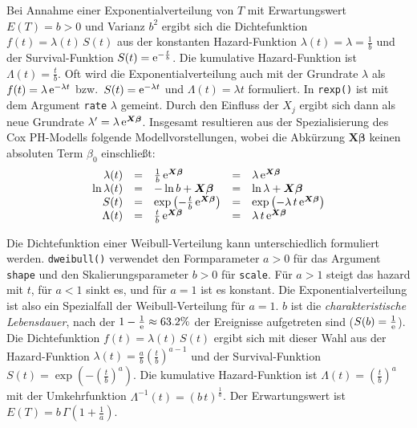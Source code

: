 Bei Annahme einer Exponentialverteilung von $T$ mit Erwartungswert $E(T) = b > 0$ und Varianz $b^{2}$ ergibt sich die Dichtefunktion $f(t) = \lambda(t) \, S(t)$ aus der konstanten Hazard-Funktion $\lambda(t) = \lambda = \frac{1}{b}$ und der Survival-Funktion $S(t) = {\mathrm{e}}^{-\frac{t}{b}}$. Die kumulative Hazard-Funktion ist $\Lambda(t) = \frac{t}{b}$. Oft wird die Exponentialverteilung auch mit der Grundrate $\lambda$ als $f(t) = \lambda \, {\mathrm{e}}^{-\lambda t}$ bzw.\ $S(t) = {\mathrm{e}}^{-\lambda t}$ und $\Lambda(t) = \lambda t$ formuliert. In \lstinline!rexp()! ist mit dem Argument \lstinline!rate! $\lambda$ gemeint. Durch den Einfluss der $X_{j}$ ergibt sich dann als neue Grundrate $\lambda' = \lambda \, {\mathrm{e}}^{\bm{X} \bm{\beta}}$. Insgesamt resultieren aus der Spezialisierung des Cox PH-Modells folgende Modellvorstellungen, wobei die Abkürzung $\bm{X} \bm{\beta}$ keinen absoluten Term $\beta_{0}$ einschließt:
\begin{equation*}
\begin{array}{rclcl}
\lambda(t)     &=& \frac{1}{b} \, {\mathrm{e}}^{\bm{X} \bm{\beta}} &=& \lambda \, {\mathrm{e}}^{\bm{X} \bm{\beta}}\\
\ln \lambda(t) &=& -\ln b + \bm{X} \bm{\beta} &=& \ln \lambda + \bm{X} \bm{\beta}\\
S(t)           &=& \exp\left(-\frac{t}{b} \, {\mathrm{e}}^{\bm{X} \bm{\beta}}\right) &=& \exp\left(-\lambda \, t \, {\mathrm{e}}^{\bm{X} \bm{\beta}}\right)\\
\Lambda(t)     &=& \frac{t}{b} \, {\mathrm{e}}^{\bm{X} \bm{\beta}} &=& \lambda \, t \, {\mathrm{e}}^{\bm{X} \bm{\beta}}
\end{array}
\end{equation*}

Die Dichtefunktion einer Weibull-Verteilung kann unterschiedlich formuliert werden. \lstinline!dweibull()! verwendet den Formparameter $a > 0$ für das Argument \lstinline!shape! und den Skalierungsparameter $b > 0$ für \lstinline!scale!. Für $a > 1$ steigt das hazard mit $t$, für $a < 1$ sinkt es, und für $a = 1$ ist es konstant. Die Exponentialverteilung ist also ein Spezialfall der Weibull-Verteilung für $a = 1$. $b$ ist die \emph{charakteristische Lebensdauer}, nach der $1-\frac{1}{{\mathrm{e}}} \approx 63.2\%$ der Ereignisse aufgetreten sind ($S(b) = \frac{1}{{\mathrm{e}}}$). Die Dichtefunktion $f(t) = \lambda(t) \, S(t)$ ergibt sich mit dieser Wahl aus der Hazard-Funktion $\lambda(t) = \frac{a}{b} \left(\frac{t}{b}\right)^{a-1}$ und der Survival-Funktion $S(t) = \exp(-(\frac{t}{b})^{a})$. Die kumulative Hazard-Funktion ist $\Lambda(t) = (\frac{t}{b})^{a}$ mit der Umkehrfunktion $\Lambda^{-1}(t) = (b \, t)^{\frac{1}{a}}$. Der Erwartungswert ist $E(T) = b \, \Gamma(1 + \frac{1}{a})$.

